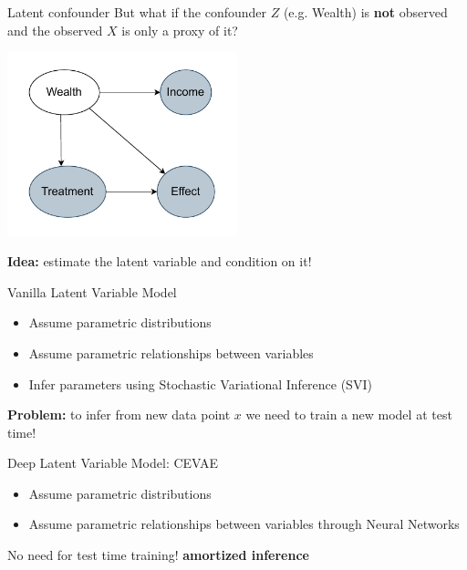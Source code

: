 \documentclass[10pt]{beamer}
\begin{document}
\begin{frame}{Latent confounder}
But what if the confounder $Z$ (e.g. Wealth) is \textbf{not} observed and the observed $X$ is only a proxy of it?
    \begin{center}
  \includegraphics[width=0.5\textwidth]{images/latent_confounder.pdf}
\end{center}
  
\textbf{Idea:} estimate the latent variable and condition on it!

 \end{frame}

 \begin{frame}{Vanilla Latent Variable Model}
     \begin{itemize}
         \item Assume parametric distributions
         \item Assume parametric relationships between variables
         \item Infer parameters using Stochastic Variational Inference (SVI)
     \end{itemize}

     \textbf{Problem:} to infer from new data point $x$ we need to train a new model at test time! 
 \end{frame}

  \begin{frame}{Deep Latent Variable Model: CEVAE}
     \begin{itemize}
         \item Assume parametric distributions
         \item Assume parametric relationships between variables through \alert{Neural Networks}
     \end{itemize}
    No need for test time training! \textbf{amortized inference}

 \end{frame}
\end{document}
